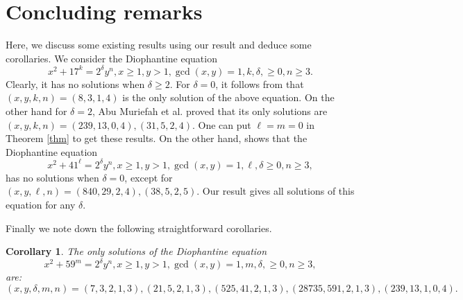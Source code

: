 \documentclass[12pt, 14paper,reqno]{amsart}
\theoremstyle{plain}
\newtheorem{cor}{Corollary}[section]
\theoremstyle{proof}
\numberwithin{equation}{section}
\begin{document}
\section{Concluding remarks}\label{S4}
Here, we discuss some existing results using our result and deduce some corollaries. We consider the Diophantine equation 
$$x^2+17^k=2^\delta y^n, x\geq 1, y>1, \gcd(x,y)=1, k, \delta, \geq 0, n\geq 3.$$
Clearly, it has no solutions when $\delta\geq 2$. For $\delta=0$, it follows from \cite[Theorem]{GW12} that $(x,y,k, n)=(8,3,1,4)$ is the only solution of the above equation. On the other hand for $\delta =2$, Abu Muriefah et al.  proved that its only  solutions are $(x,y,k,n)=(239,13,0,4), (31,5,2,4)$. One can put $\ell=m=0$ in Theorem \ref{thm} to get these results. 
On the other hand, \cite[Theorem 1.1]{AZ20} shows that the Diophantine equation  
$$x^2+41^\ell=2^\delta y^n, x\geq 1, y>1, \gcd(x,y)=1, \ell, \delta \geq 0, n\geq 3,$$
has no solutions when $\delta =0$, except for $(x,y,\ell, n)=(840,29,2,4), (38,5,2,5)$. Our result gives all solutions of this equation for any $\delta$. 

Finally we note down the following straightforward corollaries. 
\begin{cor}
The only solutions of the Diophantine equation  
$$x^2+59^m=2^\delta y^n, x\geq 1, y>1, \gcd(x,y)=1, m, \delta, \geq 0, n\geq 3,$$
are: $$(x,y,\delta, m, n)=(7,3,2,1,3), (21, 5,2,1,3), (525,41,2,1,3), (28735, 591, 2, 1,3), (239,13,1,0,4).$$ 
\end{cor}
\end{document}
